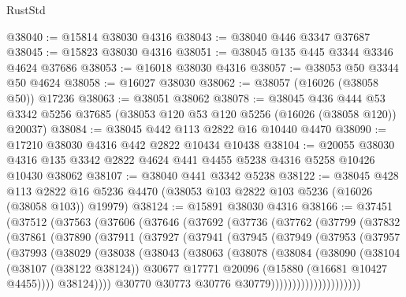\begin{lexlean}{RustStd}
\begin{coremodule}
@38040 := @15814 @38030 @4316
@38043 := @38040 @446 @3347 @37687
@38045 := @15823 @38030 @4316
@38051 := @38045 @135 @445 @3344 @3346 @4624 @37686
@38053 := @16018 @38030 @4316
@38057 := @38053 @50 @3344 @50 @4624
@38058 := @16027 @38030
@38062 := @38057 (@16026 (@38058 @50)) @17236
@38063 := @38051 @38062
@38078 := @38045
    @436
    @444
    @53
    @3342
    @5256
    @37685
    (@38053 @120 @53 @120 @5256 (@16026 (@38058 @120)) @20037)
@38084 := @38045 @442 @113 @2822 @16 @10440 @4470
@38090 := @17210 @38030 @4316 @442 @2822 @10434 @10438
@38104 := @20055
    @38030
    @4316
    @135
    @3342
    @2822
    @4624
    @441
    @4455
    @5238
    @4316
    @5258
    @10426
    @10430
    @38062
@38107 := @38040 @441 @3342 @5238
@38122 := @38045
    @428
    @113
    @2822
    @16
    @5236
    @4470
    (@38053 @103 @2822 @103 @5236 (@16026 (@38058 @103)) @19979)
@38124 := @15891 @38030 @4316
@38166 := @37451
    (@37512
      (@37563
        (@37606
          (@37646
            (@37692
              (@37736
                (@37762
                  (@37799
                    (@37832
                      (@37861
                        (@37890
                          (@37911
                            (@37927
                              (@37941
                                (@37945
                                  (@37949
                                    (@37953
                                      (@37957
                                        (@37993
                                          (@38029
                                            (@38038
                                              (@38043
                                                (@38063
                                                  (@38078
                                                    (@38084
                                                      (@38090
                                                        (@38104
                                                          (@38107 (@38122 @38124))
                                                          @30677
                                                          @17771
                                                          @20096
                                                          (@15880 (@16681 @10427 @4455))))
                                                      @38124))))
                                              @30770
                                              @30773
                                              @30776
                                              @30779)))))))))))))))))))))

\end{coremodule}
\end{lexlean}
